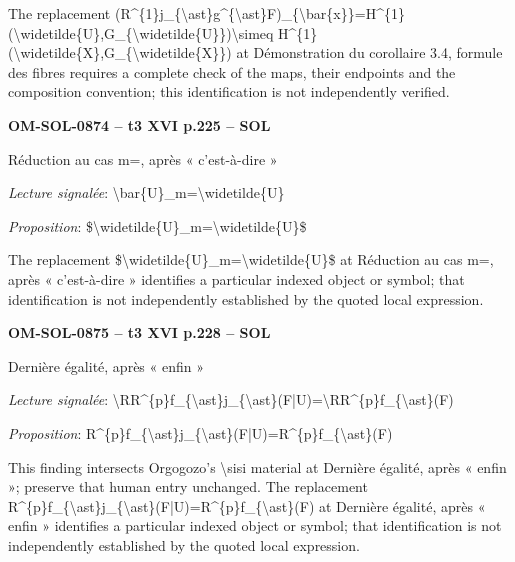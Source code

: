 The replacement (R\textasciicircum{}\{1\}j\_\{\textbackslash{}ast\}g\textasciicircum{}\{\textbackslash{}ast\}F)\_\{\textbackslash{}bar\{x\}\}=\allowbreak H\textasciicircum{}\{1\}(\textbackslash{}widetilde\{U\},G\_\{\textbackslash{}widetilde\{U\}\})\textbackslash{}simeq H\textasciicircum{}\{1\}(\textbackslash{}widetilde\{X\},G\_\{\textbackslash{}widetilde\{X\}\}) at Démonstration du corollaire 3.4, formule des fibres requires a complete check of the maps, their endpoints and the composition convention; this identification is not independently verified.\par
\par\noindent\textbf{OM-SOL-0874 -- t3 XVI p.225 -- SOL}\par
Réduction au cas m=, après « c'est-à-dire »\par
\emph{Lecture signalée}: \textbackslash{}bar\{U\}\_m=\allowbreak \textbackslash{}widetilde\{U\}\par
\emph{Proposition}: \$\textbackslash{}widetilde\{U\}\_m=\allowbreak \textbackslash{}widetilde\{U\}\$\par
The replacement \$\textbackslash{}widetilde\{U\}\_m=\allowbreak \textbackslash{}widetilde\{U\}\$ at Réduction au cas m=, après « c'est-à-dire » identifies a particular indexed object or symbol; that identification is not independently established by the quoted local expression.\par
\par\noindent\textbf{OM-SOL-0875 -- t3 XVI p.228 -- SOL}\par
Dernière égalité, après « enfin »\par
\emph{Lecture signalée}: \textbackslash{}RR\textasciicircum{}\{p\}f\_\{\textbackslash{}ast\}j\_\{\textbackslash{}ast\}(F|U)=\allowbreak \textbackslash{}RR\textasciicircum{}\{p\}f\_\{\textbackslash{}ast\}(F)\par
\emph{Proposition}: R\textasciicircum{}\{p\}f\_\{\textbackslash{}ast\}j\_\{\textbackslash{}ast\}(F|U)=\allowbreak R\textasciicircum{}\{p\}f\_\{\textbackslash{}ast\}(F)\par
This finding intersects Orgogozo's \textbackslash{}sisi material at Dernière égalité, après « enfin »; preserve that human entry unchanged. The replacement R\textasciicircum{}\{p\}f\_\{\textbackslash{}ast\}j\_\{\textbackslash{}ast\}(F|U)=\allowbreak R\textasciicircum{}\{p\}f\_\{\textbackslash{}ast\}(F) at Dernière égalité, après « enfin » identifies a particular indexed object or symbol; that identification is not independently established by the quoted local expression.\par
